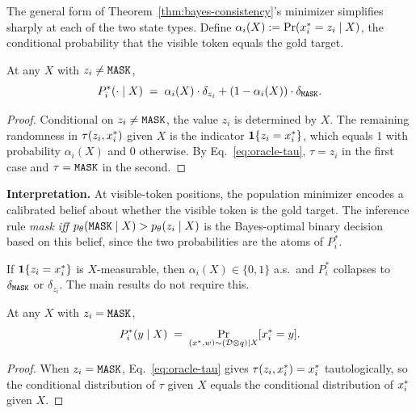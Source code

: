 The general form of Theorem~\ref{thm:bayes-consistency}'s minimizer simplifies sharply at each of the two state types. Define $\alpha_i(X) := \Pr(x^{\ast}_i = z_i \mid X)$, the conditional probability that the visible token equals the gold target.

\begin{proposition}
\label{prop:visible-belief}
At any $X$ with $z_i \neq \texttt{MASK}$,
\[
P^*_i(\cdot \mid X) \;=\; \alpha_i(X) \cdot \delta_{z_i} + (1 - \alpha_i(X)) \cdot \delta_{\texttt{MASK}}.
\]
\end{proposition}

\begin{proof}
Conditional on $z_i \neq \texttt{MASK}$, the value $z_i$ is determined by $X$. The remaining randomness in $\tau(z_i, x^{\ast}_i)$ given $X$ is the indicator $\mathbf{1}\{z_i = x^{\ast}_i\}$, which equals 1 with probability $\alpha_i(X)$ and 0 otherwise. By Eq.~\eqref{eq:oracle-tau}, $\tau = z_i$ in the first case and $\tau = \texttt{MASK}$ in the second.
\end{proof}

\textbf{Interpretation.} At visible-token positions, the population minimizer encodes a calibrated belief about whether the visible token is the gold target. The inference rule \emph{mask iff $p_\theta(\texttt{MASK} \mid X) > p_\theta(z_i \mid X)$} is the Bayes-optimal binary decision based on this belief, since the two probabilities are the atoms of $P^*_i$.

\begin{remark}
If $\mathbf{1}\{z_i = x^{\ast}_i\}$ is $X$-measurable, then $\alpha_i(X) \in \{0, 1\}$ a.s.\ and $P^*_i$ collapses to $\delta_{\texttt{MASK}}$ or $\delta_{z_i}$. The main results do not require this.
\end{remark}

\begin{proposition}
\label{prop:mask-belief}
At any $X$ with $z_i = \texttt{MASK}$,
\[
P^*_i(y \mid X) \;=\; \Pr_{(x^{\ast}, w) \sim (\mathcal{D} \otimes q) \mid X}[x^{\ast}_i = y].
\]
\end{proposition}

\begin{proof}
When $z_i = \texttt{MASK}$, Eq.~\eqref{eq:oracle-tau} gives $\tau(z_i, x^{\ast}_i) = x^{\ast}_i$ tautologically, so the conditional distribution of $\tau$ given $X$ equals the conditional distribution of $x^{\ast}_i$ given $X$.
\end{proof}

